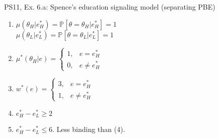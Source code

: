 \begin{frame}{PS11, Ex. 6.a: Spence’s education signaling model (separating PBE)}
\begin{multicols}{2}
\begin{enumerate}
        \item \vspace{-2pt}$\mu\left(\theta_H|e_H^*\right)=
               \mathbb{P}\left[\theta=\theta_H|e_H^*\right]=1$\\
              $\mu\left(\theta_L|e_L^*\right)=
               \mathbb{P}\left[\theta=\theta_L|e_L^*\right]=1$
        \item \vspace{-2pt}$\mu^*(\theta_H|e)=\left\{\begin{array}{ll}
                  1, & e = e_H^* \\
                  0, & e \neq e_H^*
               \end{array}\right.$
        \item \vspace{-2pt}$w^*(e)=\left\{\begin{array}{ll}
                  3, & e = e_H^* \\
                  1, & e \neq e_H^*
               \end{array}\right.$
        \item \vspace{-2pt}$e_H^*-e_L^*\geq2$
        \item \vspace{-2pt}$e_H^*-e_L^*\leq6$. Less binding than (4).
      \end{enumerate}
    \end{multicols}
    \vfill\null
\end{frame}
